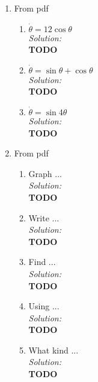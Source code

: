 \documentclass[10pt]{amsart}
\theoremstyle{nonumberplain}
\begin{document}
\begin{enumerate}[label={\bf {\arabic*}:}]
\item From pdf \\
\begin{enumerate}

\item $\dot \theta = 1 2 \cos \theta$ \\
\textit{Solution:} \\
\textbf{TODO} \\

\item $\dot \theta = \sin \theta + \cos \theta$ \\
\textit{Solution:} \\
\textbf{TODO} \\

\item $\dot \theta = \sin 4 \theta$ \\
\textit{Solution:} \\
\textbf{TODO} \\

\end{enumerate}

\newpage

\item From pdf \\

\begin{enumerate}

\item Graph ... \\
\textit{Solution:} \\
\textbf{TODO} \\

\item Write ... \\
\textit{Solution:} \\
\textbf{TODO} \\

\item Find ... \\
\textit{Solution:} \\
\textbf{TODO} \\

\item Using ... \\
\textit{Solution:} \\
\textbf{TODO} \\

\item What kind ... \\
\textit{Solution:} \\
\textbf{TODO} \\


\end{enumerate}
\end{enumerate}
\end{document}
